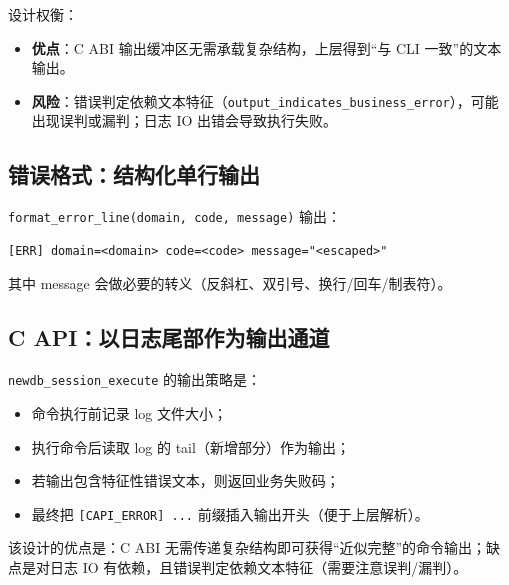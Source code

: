 设计权衡：

\begin{itemize}
  \item \textbf{优点}：C ABI 输出缓冲区无需承载复杂结构，上层得到“与 CLI 一致”的文本输出。
  \item \textbf{风险}：错误判定依赖文本特征（\texttt{output\_indicates\_business\_error}），可能出现误判或漏判；日志 IO 出错会导致执行失败。
\end{itemize}

\subsection{错误格式：结构化单行输出}

\texttt{format\_error\_line(domain, code, message)} 输出：

\begin{lstlisting}
[ERR] domain=<domain> code=<code> message="<escaped>"
\end{lstlisting}

其中 message 会做必要的转义（反斜杠、双引号、换行/回车/制表符）。

\subsection{C API：以日志尾部作为输出通道}

\texttt{newdb\_session\_execute} 的输出策略是：

\begin{itemize}
  \item 命令执行前记录 log 文件大小；
  \item 执行命令后读取 log 的 tail（新增部分）作为输出；
  \item 若输出包含特征性错误文本，则返回业务失败码；
  \item 最终把 \texttt{[CAPI\_ERROR] ...} 前缀插入输出开头（便于上层解析）。
\end{itemize}

该设计的优点是：C ABI 无需传递复杂结构即可获得“近似完整”的命令输出；缺点是对日志 IO 有依赖，且错误判定依赖文本特征（需要注意误判/漏判）。

